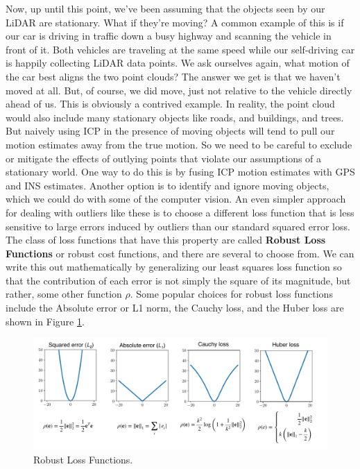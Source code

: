 Now, up until this point, we've been assuming
that the objects seen by our LiDAR are stationary. What
if they're moving? A common example of this is
if our car is driving in traffic down a busy highway and scanning the vehicle
in front of it. Both vehicles are traveling
at the same speed while our self-driving car is happily collecting LiDAR data points. We ask ourselves again, what motion of the car best
aligns the two point clouds? The answer we get is that
we haven't moved at all. But, of course, we did move, just not relative to the vehicle
directly ahead of us. This is obviously
a contrived example. In reality, the point
cloud would also include many stationary
objects like roads, and buildings, and trees. But naively using ICP in
the presence of moving objects will tend
to pull our motion estimates away from
the true motion. So we need to be
careful to exclude or mitigate the effects of
outlying points that violate our assumptions
of a stationary world. One way to do this is
by fusing ICP motion estimates with GPS
and INS estimates. Another option is to identify
and ignore moving objects, which we could do with some
of the computer vision. An even simpler
approach for dealing with outliers like these is to choose a different loss function that is less sensitive to large errors induced by outliers than our standard
squared error loss. The class of loss functions that have this
property are called \textbf{Robust Loss Functions} or
robust cost functions, and there are several
to choose from. We can write this
out mathematically by generalizing our least squares loss function so that
the contribution of each error is not simply
the square of its magnitude, but rather, some
other function $\rho$. Some popular choices for
robust loss functions include the Absolute
error or L1 norm, the Cauchy loss, and
the Huber loss are shown in Figure \ref{lidar_10}. 

\begin{figure}[!htb]
\begin{center}
\includegraphics[scale=0.280]{img/hardware/lidar_10.jpeg}
\end{center}
\caption{Robust Loss Functions.}
\label{lidar_10}
\end{figure}

